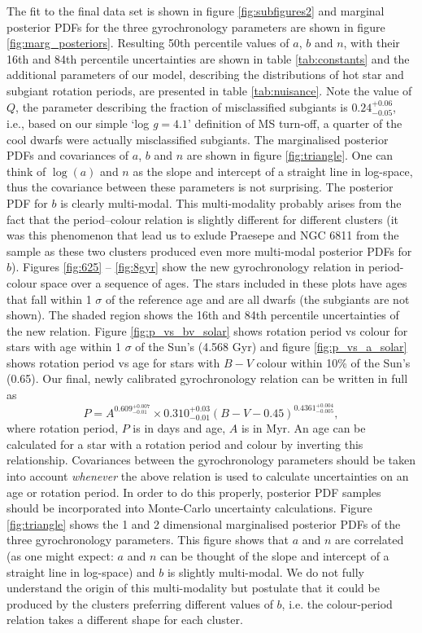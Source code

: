 \documentclass[11pt,preprint]{aastex}
\newcommand{\logg}{log \emph{g}}
\newcommand{\gyroa}{0.310}
\newcommand{\aerrp}{0.03}
\newcommand{\aerrm}{0.01}
\newcommand{\gyron}{0.609}
\newcommand{\nerrp}{0.007}
\newcommand{\nerrm}{0.01}
\newcommand{\gyrob}{0.4361}
\newcommand{\berrp}{0.004}
\newcommand{\berrm}{0.005}
\newcommand{\Q}{0.24}
\newcommand{\Qerrp}{0.06}
\newcommand{\Qerrm}{0.05}
\begin{document}
The fit to the final data set is shown in figure \ref{fig:subfigures2} and
marginal posterior PDFs for the three gyrochronology parameters are
shown in figure \ref{fig:marg_posteriors}.
Resulting 50th percentile values of $a$, $b$ and $n$, with their 16th and 84th
percentile uncertainties are shown in table \ref{tab:constants} and the
additional parameters of our model, describing the distributions of hot star
and subgiant rotation periods, are presented in table \ref{tab:nuisance}.
Note the value of $Q$, the parameter describing the fraction of misclassified
subgiants is $\Q^{+\Qerrp}_{-\Qerrm}$, i.e., based on our simple `\logg$=4.1$'
definition of MS turn-off, a quarter of the cool dwarfs were actually
misclassified subgiants.
The marginalised posterior PDFs and covariances of $a$, $b$ and $n$ are shown
in figure \ref{fig:triangle}.
One can think of $\log(a)$ and $n$ as the slope and intercept of a straight
line in log-space, thus the covariance between these parameters is not
surprising.
The posterior PDF for $b$ is clearly multi-modal.
This multi-modality probably arises from the fact that the period--colour
relation is slightly different for different clusters (it was this phenomenon
that lead us to exlude Praesepe and NGC 6811 from the sample as these two
clusters produced even more multi-modal posterior PDFs for $b$).
Figures \ref{fig:625} -- \ref{fig:8gyr} show the new gyrochronology relation
in period-colour space over a sequence of ages.
The stars included in these plots have ages that fall within 1 $\sigma$ of the
reference age and are all dwarfs (the subgiants are not shown).
The shaded region shows the 16th and 84th percentile uncertainties of the new
relation.
Figure \ref{fig:p_vs_bv_solar} shows rotation period vs colour for stars with
age within 1 $\sigma$ of the Sun's (4.568 Gyr) and figure
\ref{fig:p_vs_a_solar} shows rotation period vs age for stars with $B-V$
colour within 10\% of the Sun's (0.65).
Our final, newly calibrated gyrochronology relation can be written in full as
\begin{equation}
	P = A^{\gyron^{+\nerrp}_{-\nerrm}} \times \gyroa^{+\aerrp}_{-\aerrm}
	(B-V-0.45)^{\gyrob^{+\berrp}_{-\berrm}},
\label{eq:Barnes2007_3}
\end{equation}
where rotation period, $P$ is in days and age, $A$ is in Myr.
An age can be calculated for a star with a rotation period and colour by
inverting this relationship.
Covariances between the gyrochronology parameters should
be taken into account {\it whenever} the above relation is used to calculate
uncertainties on an age or rotation period.
In order to do this properly, posterior PDF samples should be incorporated into
Monte-Carlo uncertainty calculations.
Figure \ref{fig:triangle} shows the 1 and 2 dimensional marginalised posterior
PDFs of the three gyrochronology parameters.
This figure shows that $a$ and $n$ are correlated (as one might expect: $a$ and
$n$ can be thought of the slope and intercept of a straight line in log-space)
and $b$ is slightly multi-modal.
We do not fully understand the origin of this multi-modality but postulate that
it could be produced by the clusters preferring different values of $b$, i.e.
the colour-period relation takes a different shape for each cluster.
\end{document}

